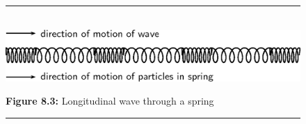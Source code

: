     \setcounter{subfigure}{0}
	\begin{figure}[H] %
    \begin{center}
    \rule[.1in]{\figurerulewidth}{.005in} \\
        \label{m38782*uid5!!!underscore!!!media}\label{m38782*uid5!!!underscore!!!printimage}\includegraphics[width=0.8\columnwidth]{col11305.imgs/m38782_PG11C4_003.png} %
      \vspace{2pt}
    \vspace{\rubberspace}\par \begin{cnxcaption}
	  \small \textbf{Figure 8.3: }Longitudinal wave through a spring
	\end{cnxcaption}
    \vspace{.1in}
    \rule[.1in]{\figurerulewidth}{.005in} \\
    \end{center}
 \end{figure}       
    \label{m38782*cid4}
